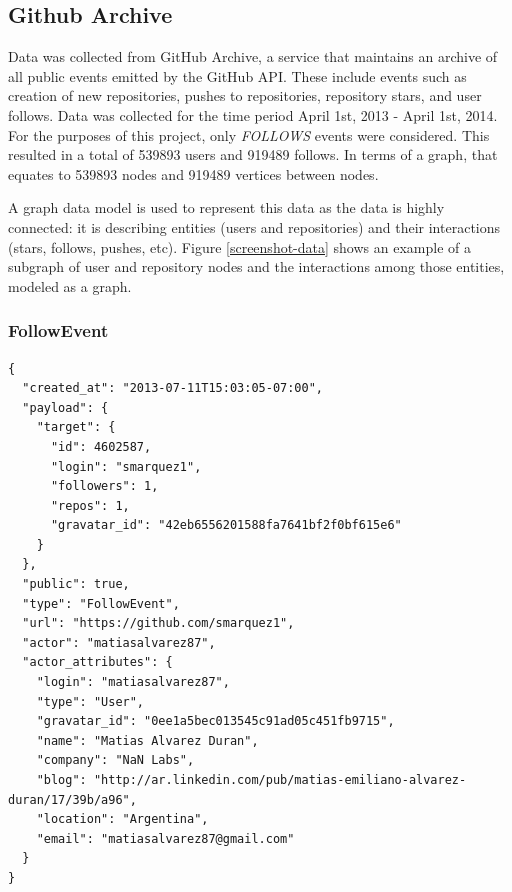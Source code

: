 \subsection{Github Archive}
Data was collected from GitHub Archive\cite{githubarchive}, a service that maintains an archive of all public events emitted by the GitHub API\cite{github:Online}. These include events such as creation of new repositories, pushes to repositories, repository stars, and user follows. Data was collected for the time period April 1st, 2013 - April 1st, 2014. For the purposes of this project, only \textit{FOLLOWS} events were considered. This resulted in a total of 539893 users and 919489 follows. In terms of a graph, that equates to 539893 nodes and 919489 vertices between nodes.

A graph data model is used to represent this data as the data is highly connected: it is describing entities (users and repositories) and their interactions (stars, follows, pushes, etc). Figure \ref{screenshot-data} shows an example of a subgraph of user and repository nodes and the interactions among those entities, modeled as a graph.

\subsubsection{FollowEvent}
\begin{lstlisting}[style=lstStyleCpp, caption={LaTeX Typesetting By Example}, label=lstLaTeXExample]
{
  "created_at": "2013-07-11T15:03:05-07:00",
  "payload": {
    "target": {
      "id": 4602587,
      "login": "smarquez1",
      "followers": 1,
      "repos": 1,
      "gravatar_id": "42eb6556201588fa7641bf2f0bf615e6"
    }
  },
  "public": true,
  "type": "FollowEvent",
  "url": "https://github.com/smarquez1",
  "actor": "matiasalvarez87",
  "actor_attributes": {
    "login": "matiasalvarez87",
    "type": "User",
    "gravatar_id": "0ee1a5bec013545c91ad05c451fb9715",
    "name": "Matias Alvarez Duran",
    "company": "NaN Labs",
    "blog": "http://ar.linkedin.com/pub/matias-emiliano-alvarez-duran/17/39b/a96",
    "location": "Argentina",
    "email": "matiasalvarez87@gmail.com"
  }
}
\end{lstlisting}

